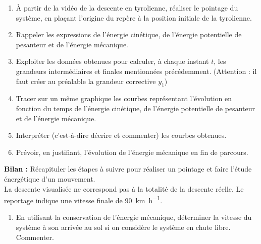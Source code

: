 \documentclass[a4paper,11pt,fleqn]{article}%
\begin{document}
\begin{enumerate}
	\item À partir de la vidéo de la descente en tyrolienne, réaliser le pointage du système, en plaçant l'origine du repère à la position initiale de la tyrolienne.
	\item Rappeler les expressions de l'énergie cinétique, de l'énergie potentielle de pesanteur et de l'énergie mécanique.
	\item Exploiter les données obtenues pour calculer, à chaque instant $t$, les grandeurs intermédiaires et finales mentionnées précédemment. (Attention : il faut créer au préalable la grandeur corrective $y_1$)
	\item Tracer sur un même graphique les courbes représentant l'évolution en fonction du temps de l'énergie cinétique, de l'énergie potentielle de pesanteur et de l'énergie mécanique.
	\item Interpréter (c'est-à-dire décrire et commenter) les courbes obtenues.
	\item Prévoir, en justifiant, l'évolution de l'énergie mécanique en fin de parcours.
\end{enumerate}
\textbf{Bilan :} Récapituler les étapes à suivre pour réaliser un pointage et faire l'étude énergétique d'un mouvement.\\
La descente visualisée ne correspond pas à la totalité de la descente réelle. Le reportage indique une vitesse finale de \SI{90}{\kilo \meter \per \hour}.
\begin{enumerate}[resume]
	\item En utilisant la conservation de l'énergie mécanique, déterminer la vitesse du système à son arrivée au sol si on considère le système en chute libre. Commenter.
\end{enumerate}
\end{document}
